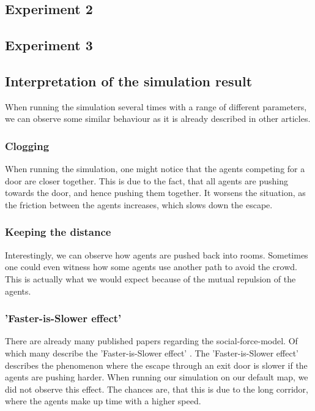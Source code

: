 \documentclass[11pt]{article}
\begin{document}
\subsection{Experiment 2}

\subsection{Experiment 3}

\subsection{Interpretation of the simulation result}
When running the simulation several times with a range of different parameters, we can observe some similar behaviour as it is already described in other articles.

\subsubsection{Clogging}
When running the simulation, one might notice that the agents competing for a door are closer together. This is due to the fact, that all agents are pushing towards the door, and hence pushing them together. It worsens the situation, as the friction between the agents increases, which slows down the escape.  
    
\subsubsection{Keeping the distance}
Interestingly, we can observe how agents are pushed back into rooms. Sometimes one could even witness how some agents use another path to avoid the crowd. This is actually what we would expect because of the mutual repulsion of the agents. 

\subsubsection{'Faster-is-Slower effect'}
There are already many published papers regarding the social-force-model. Of which many describe the 'Faster-is-Slower effect' \cite{Helbing, Wang}. The 'Faster-is-Slower effect' describes the phenomenon where the escape through an exit door is slower if the agents are pushing harder. When running our simulation on our default map, we did not observe this effect. The chances are, that this is due to the long corridor, where the agents make up time with a higher speed.
\end{document}
